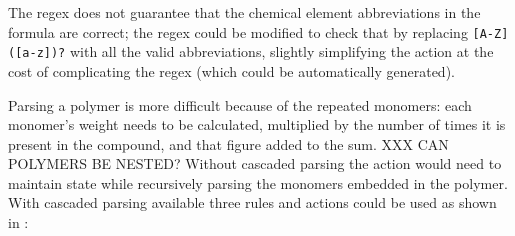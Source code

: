 The regex does not guarantee that the chemical element abbreviations in the
formula are correct; the regex could be modified to check that by replacing
\verb![A-Z]([a-z])?! with all the valid abbreviations, slightly simplifying
the action at the cost of complicating the regex (which could be
automatically generated).

Parsing a polymer is more difficult because of the repeated monomers: each
monomer's weight needs to be calculated, multiplied by the number of times
it is present in the compound, and that figure added to the sum.  XXX CAN
POLYMERS BE NESTED\@?  Without cascaded parsing the action would need to
maintain state while recursively parsing the monomers embedded in the
polymer.  With cascaded parsing available three rules and actions could be
used as shown in :

\newlength{\chemicalactionwidth}
\setlength{\chemicalactionwidth}{\textwidth}
\addtolength{\chemicalactionwidth}{-30pt}
\addtolength{\chemicalactionwidth}{-130pt}
\addtolength{\chemicalactionwidth}{-24pt}

